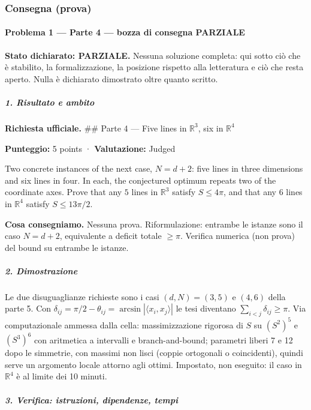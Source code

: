 \documentclass[11pt,a4paper]{article}
\begin{document}
\subsubsection{Consegna (prova)}
\paragraph{Problema 1 --- Parte 4 --- bozza di consegna
PARZIALE}\label{problema-1-parte-4-bozza-di-consegna-parziale}

\textbf{Stato dichiarato: PARZIALE.} Nessuna soluzione completa: qui
sotto ciò che è stabilito, la formalizzazione, la posizione rispetto
alla letteratura e ciò che resta aperto. Nulla è dichiarato dimostrato
oltre quanto scritto.

\subparagraph{1. Risultato e ambito}\label{risultato-e-ambito}

\textbf{Richiesta ufficiale.} \#\# Parte 4 --- Five lines in
\(\mathbb{R}^3\), six in \(\mathbb{R}^4\)

\textbf{Punteggio:} 5 points · \textbf{Valutazione:} Judged

Two concrete instances of the next case, \(N = d+2\): five lines in
three dimensions and six lines in four. In each, the conjectured optimum
repeats two of the coordinate axes. Prove that any \(5\) lines in
\(\mathbb{R}^3\) satisfy \(S \le 4\pi\), and that any \(6\) lines in
\(\mathbb{R}^4\) satisfy \(S \le 13\pi/2\).

\textbf{Cosa consegniamo.} Nessuna prova. Riformulazione: entrambe le
istanze sono il caso \(N=d+2\), equivalente a deficit totale \(\ge\pi\).
Verifica numerica (non prova) del bound su entrambe le istanze.

\subparagraph{2. Dimostrazione}\label{dimostrazione}

Le due disuguaglianze richieste sono i casi \((d,N)=(3,5)\) e \((4,6)\)
della parte 5. Con
\(\delta_{ij}=\pi/2-\theta_{ij}=\arcsin|\langle x_i,x_j\rangle|\) le
tesi diventano \(\sum_{i<j}\delta_{ij}\ge\pi\). Via computazionale
ammessa dalla cella: massimizzazione rigorosa di \(S\) su \((S^2)^5\) e
\((S^3)^6\) con aritmetica a intervalli e branch-and-bound; parametri
liberi 7 e 12 dopo le simmetrie, con massimi non lisci (coppie
ortogonali o coincidenti), quindi serve un argomento locale attorno agli
ottimi. Impostato, non eseguito: il caso in \(\mathbb R^4\) è al limite
dei 10 minuti.

\subparagraph{3. Verifica: istruzioni, dipendenze,
tempi}\label{verifica-istruzioni-dipendenze-tempi}
\end{document}
